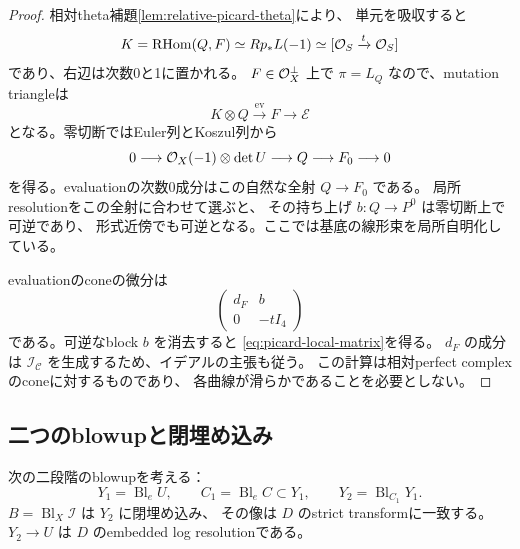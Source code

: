 \begin{proof}
相対theta補題\ref{lem:relative-picard-theta}により、
単元を吸収すると
\[
 K=\operatorname{RHom}(Q,F)\simeq Rp_*L(-1)
   \simeq[\mathcal O_S\xrightarrow{t}\mathcal O_S]
\]
であり、右辺は次数0と1に置かれる。
$F\in\mathcal O_X^\perp$ 上で $\pi=L_Q$ なので、mutation triangleは
\[
 K\otimes Q\xrightarrow{\mathrm{ev}}F\longrightarrow\mathcal E
\]
となる。零切断ではEuler列とKoszul列から
\[
 0\longrightarrow\mathcal O_X(-1)\otimes\det U
 \longrightarrow Q\longrightarrow F_0\longrightarrow0
\]
を得る。evaluationの次数0成分はこの自然な全射 $Q\to F_0$ である。
局所resolutionをこの全射に合わせて選ぶと、
その持ち上げ $b:Q\to P^0$ は零切断上で可逆であり、
形式近傍でも可逆となる。ここでは基底の線形束を局所自明化している。

evaluationのconeの微分は
\[
 \begin{pmatrix}
  d_F&b\\
  0&-tI_4
 \end{pmatrix}
\]
である。可逆なblock $b$ を消去すると
\eqref{eq:picard-local-matrix}を得る。
$d_F$ の成分は $\mathcal I_{\mathscr C}$ を生成するため、イデアルの主張も従う。
この計算は相対perfect complexのconeに対するものであり、
各曲線が滑らかであることを必要としない。
\end{proof}

\subsection{二つのblowupと閉埋め込み}

\begin{theorem}[境界の埋め込み解消]\label{thm:bn-double-blowup}
次の二段階のblowupを考える：
\[
 Y_1=\operatorname{Bl}_eU,\qquad
 C_1=\operatorname{Bl}_eC\subset Y_1,\qquad
 Y_2=\operatorname{Bl}_{C_1}Y_1.
\]
$B=\operatorname{Bl}_X\mathcal I$ は $Y_2$ に閉埋め込み、
その像は $D$ のstrict transformに一致する。
$Y_2\to U$ は $D$ のembedded log resolutionである。
\end{theorem}

